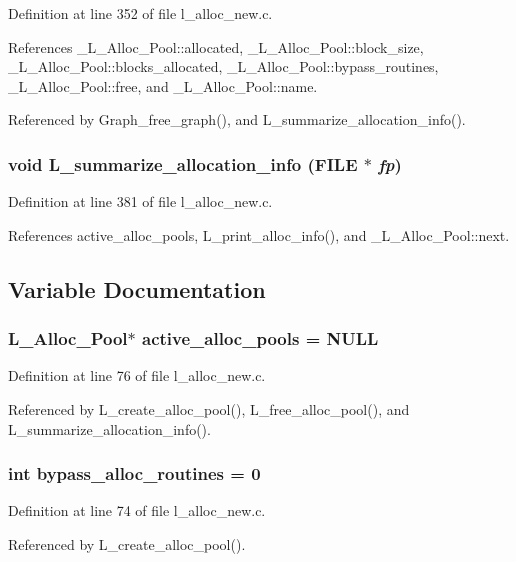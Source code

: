 Definition at line 352 of file l\_\-alloc\_\-new.c.

References \_\-L\_\-Alloc\_\-Pool::allocated, \_\-L\_\-Alloc\_\-Pool::block\_\-size, \_\-L\_\-Alloc\_\-Pool::blocks\_\-allocated, \_\-L\_\-Alloc\_\-Pool::bypass\_\-routines, \_\-L\_\-Alloc\_\-Pool::free, and \_\-L\_\-Alloc\_\-Pool::name.

Referenced by Graph\_\-free\_\-graph(), and L\_\-summarize\_\-allocation\_\-info().
\subsubsection{\setlength{\rightskip}{0pt plus 5cm}void L\_\-summarize\_\-allocation\_\-info (FILE $\ast$ {\em fp})}\label{l__alloc__new_8c_f1a7e407007f958a74e86a023a071642}




Definition at line 381 of file l\_\-alloc\_\-new.c.

References active\_\-alloc\_\-pools, L\_\-print\_\-alloc\_\-info(), and \_\-L\_\-Alloc\_\-Pool::next.

\subsection{Variable Documentation}
\subsubsection{\setlength{\rightskip}{0pt plus 5cm}\bf{L\_\-Alloc\_\-Pool}$\ast$ \bf{active\_\-alloc\_\-pools} = NULL\hspace{0.3cm}{\tt  [static]}}\label{l__alloc__new_8c_c44b765e5ba6fd0bf358748dc12824e1}




Definition at line 76 of file l\_\-alloc\_\-new.c.

Referenced by L\_\-create\_\-alloc\_\-pool(), L\_\-free\_\-alloc\_\-pool(), and L\_\-summarize\_\-allocation\_\-info().
\subsubsection{\setlength{\rightskip}{0pt plus 5cm}int \bf{bypass\_\-alloc\_\-routines} = 0}\label{l__alloc__new_8c_a3b32dfd5d5c937e01c07ffd52c4ecda}




Definition at line 74 of file l\_\-alloc\_\-new.c.

Referenced by L\_\-create\_\-alloc\_\-pool().